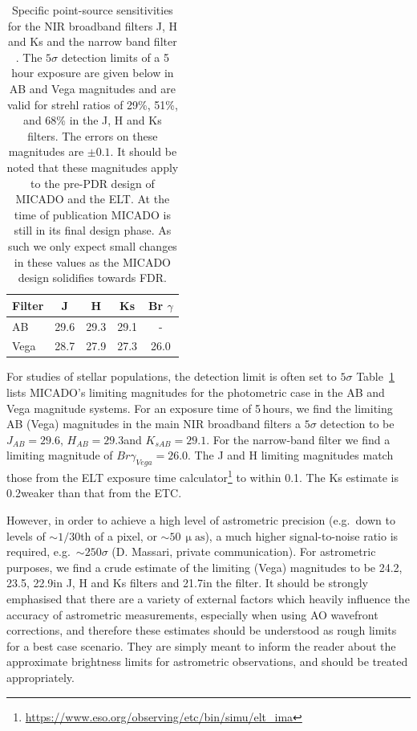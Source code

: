 \begin{table}

    \centering
    \caption{Specific point-source sensitivities for the NIR broadband filters J, H and Ks and the narrow band filter \brgamma. The $5\sigma$ detection limits of a 5 hour exposure are given below in AB and Vega magnitudes and are valid for strehl ratios of 29\%, 51\%, and 68\% in the J, H and Ks filters. The errors on these magnitudes are $\pm 0.1$\m. It should be noted that these magnitudes apply to the pre-PDR design of MICADO and the ELT. At the time of publication MICADO is still in its final design phase. As such we only expect small changes in these values as the MICADO design solidifies towards FDR.}
    \label{tbl:micado_point_source_sensitivities}

    \begin{tabular}{ l | c c c c }
        \hline\hline
Filter          & J         & H        & Ks         & Br $\gamma$   \\
        \hline                
    AB          & 29.6\m    & 29.3\m   & 29.1\m     & -              \\
        \hline                
    Vega        & 28.7\m    & 27.9\m   & 27.3\m     & 26.0\m        \\
        \hline                
    \end{tabular}

\end{table}


For studies of stellar populations, the detection limit is often set to $5\sigma$
Table~\ref{tbl:micado_point_source_sensitivities} lists MICADO's limiting magnitudes for the photometric case in the AB and Vega magnitude systems. For an exposure time of 5\,hours, we find the limiting  AB (Vega) magnitudes in the main NIR broadband filters a $5\sigma$ detection to be $J_{AB}=29.6$\m, $H_{AB}=29.3$\m and $K_{s  AB}=29.1$\m. For the narrow-band filter \brgamma we find a limiting magnitude of $Br\gamma_{Vega}=26.0$\m. The J and H limiting magnitudes match those from the ELT exposure time calculator\footnote{\url{https://www.eso.org/observing/etc/bin/simu/elt_ima}} to within 0.1\m. The Ks estimate is 0.2\m weaker than that from the ETC.

However, in order to achieve a high level of astrometric precision (e.g.\ down to levels of $\sim 1/30$th of a pixel, or $\sim 50\,\upmu\mathrm{as}$), a much higher signal-to-noise ratio is required, e.g.\ $\sim 250\sigma$ (D. Massari, private communication). For astrometric purposes, we find a crude estimate of the limiting (Vega) magnitudes to be 24.2\m, 23.5\m, 22.9\m in J, H and Ks filters and 21.7\m in the \brgamma filter. It should be strongly emphasised that there are a variety of external factors which heavily influence the accuracy of astrometric measurements, especially when using AO wavefront corrections, and therefore these estimates should be understood as rough limits for a best case scenario. They are simply meant to inform the reader about the approximate brightness limits for astrometric observations, and should be treated appropriately. 

